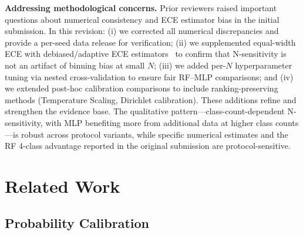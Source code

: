 \documentclass[11pt]{article}
\begin{document}
\textbf{Addressing methodological concerns.} Prior reviewers raised important questions about numerical consistency and ECE estimator bias in the initial submission. In this revision: (i) we corrected all numerical discrepancies and provide a per-seed data release for verification; (ii) we supplemented equal-width ECE with debiased/adaptive ECE estimators~\cite{roelofs2022mitigating,nixon2019measuring} to confirm that N-sensitivity is not an artifact of binning bias at small $N$; (iii) we added per-$N$ hyperparameter tuning via nested cross-validation to ensure fair RF--MLP comparisons; and (iv) we extended post-hoc calibration comparisons to include ranking-preserving methods (Temperature Scaling, Dirichlet calibration). These additions refine and strengthen the evidence base. The qualitative pattern---class-count-dependent N-sensitivity, with MLP benefiting more from additional data at higher class counts---is robust across protocol variants, while specific numerical estimates and the RF 4-class advantage reported in the original submission are protocol-sensitive.

\section{Related Work}

\subsection{Probability Calibration}
\end{document}
